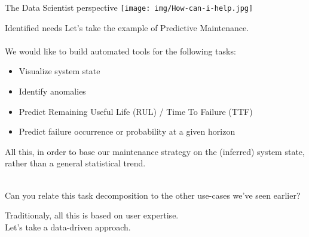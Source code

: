 \documentclass{beamer}
\begin{document}
\begin{frame}{The Data Scientist perspective}
\centering \texttt{[image: img/How-can-i-help.jpg]}
\end{frame}

\begin{frame}{Identified needs}
Let's take the example of Predictive Maintenance.\\
~\\
We would like to build automated tools for the following tasks:
\begin{itemize}
\item Visualize system state
\item Identify anomalies
\item Predict Remaining Useful Life (RUL) / Time To Failure (TTF)
\item Predict failure occurrence or probability at a given horizon
\end{itemize}
All this, in order to base our maintenance strategy on the (inferred) system state, rather than a general statistical trend.\\
~\\
\begin{block}{}
Can you relate this task decomposition to the other use-cases we've seen earlier?
\end{block}
Traditionaly, all this is based on user expertise.\\
Let's take a data-driven approach.
\end{frame}
\end{document}
